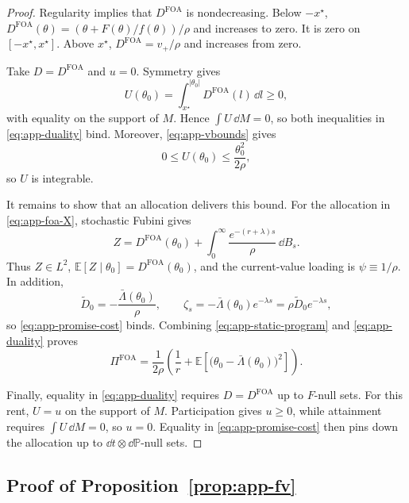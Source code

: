 \documentclass[12pt]{article}
\newcommand{\E}{\mathbb{E}}
\begin{document}
\begin{proof}
Regularity implies that \(D^{\mathrm{FOA}}\) is nondecreasing. Below \(-x^\star\),
\(D^{\mathrm{FOA}}(\theta)=(\theta+F(\theta)/f(\theta))/\rho\)
and increases to zero. It is zero on
\([-x^\star,x^\star]\). Above \(x^\star\),
\(D^{\mathrm{FOA}}=v_+/\rho\) and increases from zero.

Take \(D=D^{\mathrm{FOA}}\) and \(u=0\). Symmetry gives
\[
  U(\theta_0)
  =
  \int_{x^\star}^{|\theta_0|}
    D^{\mathrm{FOA}}(l)\,\dd l
  \geq0,
\]
with equality on the support of \(M\). Hence
\(\int U\,\dd M=0\), so both inequalities in
\eqref{eq:app-duality} bind. Moreover,
\eqref{eq:app-vbounds} gives
\[
  0\leq U(\theta_0)\leq\frac{\theta_0^2}{2\rho},
\]
so \(U\) is integrable.

It remains to show that an allocation delivers this bound. For the
allocation in \eqref{eq:app-foa-X}, stochastic Fubini gives
\begin{equation}\label{eq:app-Z-rep}
  Z
  =
  D^{\mathrm{FOA}}(\theta_0)
  +\int_0^\infty
    \frac{e^{-(r+\lambda)s}}{\rho}\,\dd B_s.
\end{equation}
Thus \(Z\in L^2\),
\(\E[Z\mid\theta_0]=D^{\mathrm{FOA}}(\theta_0)\), and the
current-value loading is \(\psi\equiv1/\rho\). In addition,
\[
  \widetilde D_0
  =
  -\frac{\bar\Lambda(\theta_0)}{\rho},
  \qquad
  \zeta_s
  =
  -\bar\Lambda(\theta_0)e^{-\lambda s}
  =
  \rho\widetilde D_0e^{-\lambda s},
\]
so \eqref{eq:app-promise-cost} binds. Combining
\eqref{eq:app-static-program} and \eqref{eq:app-duality} proves
\[
  \Pi^{\mathrm{FOA}}
  =
  \frac{1}{2\rho}
  \left(
    \frac1r+
    \E\left[
      \bigl(\theta_0-\bar\Lambda(\theta_0)\bigr)^2
    \right]
  \right).
\]

Finally, equality in \eqref{eq:app-duality} requires
\(D=D^{\mathrm{FOA}}\) up to \(F\)-null sets. For this rent,
\(U=u\) on the support of \(M\). Participation gives \(u\geq0\),
while attainment requires \(\int U\,\dd M=0\), so \(u=0\).
Equality in \eqref{eq:app-promise-cost} then pins down the allocation
up to \(\dd t\otimes\dd\mathbb P\)-null sets.
\end{proof}

\subsection{Proof of Proposition~\ref{prop:app-fv}}
\label{app:proof-fv}
\end{document}

